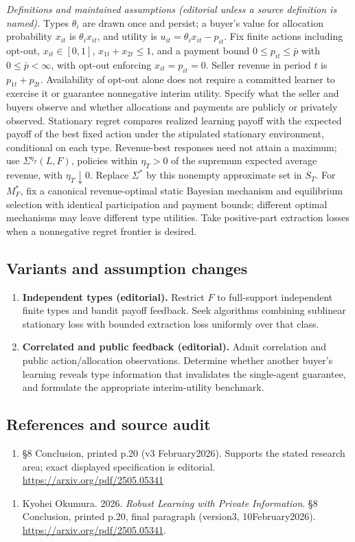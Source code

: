 \documentclass[11pt,a4paper]{article}
\begin{document}
\emph{Definitions and maintained assumptions (editorial unless a source definition is named).} Types \(\theta_i\) are drawn once and persist; a buyer’s value for allocation probability \(x_{it}\) is \(\theta_i x_{it}\), and utility is \(u_{it}=\theta_i x_{it}-p_{it}\). Fix finite actions including opt-out, \(x_{it}\in[0,1]\), \(x_{1t}+x_{2t}\le1\), and a payment bound \(0\le p_{it}\le\bar p\) with \(0\le\bar p<\infty\), with opt-out enforcing \(x_{it}=p_{it}=0\). Seller revenue in period \(t\) is \(p_{1t}+p_{2t}\). Availability of opt-out alone does not require a committed learner to exercise it or guarantee nonnegative interim utility. Specify what the seller and buyers observe and whether allocations and payments are publicly or privately observed. Stationary regret compares realized learning payoff with the expected payoff of the best fixed action under the stipulated stationary environment, conditional on each type. Revenue-best responses need not attain a maximum; use \(\Sigma^{\eta_T}(L,F)\), policies within \(\eta_T>0\) of the supremum expected average revenue, with \(\eta_T\downarrow0\). Replace \(\Sigma^*\) by this nonempty approximate set in \(S_T\). For \(M_F^*\), fix a canonical revenue-optimal static Bayesian mechanism and equilibrium selection with identical participation and payment bounds; different optimal mechanisms may leave different type utilities. Take positive-part extraction losses when a nonnegative regret frontier is desired.
\subsection*{Variants and assumption changes}
\begin{enumerate}
\item \textbf{Independent types (editorial).} Restrict \(F\) to full-support independent finite types and bandit payoff feedback. Seek algorithms combining sublinear stationary loss with bounded extraction loss uniformly over that class.
\item \textbf{Correlated and public feedback (editorial).} Admit correlation and public action/allocation observations. Determine whether another buyer’s learning reveals type information that invalidates the single-agent guarantee, and formulate the appropriate interim-utility benchmark.
\end{enumerate}
\subsection*{References and source audit}
\begin{enumerate}
\item §8 Conclusion, printed p.20 (v3 February2026). Supports the stated research area; exact displayed specification is editorial. \url{https://arxiv.org/pdf/2505.05341}
\end{enumerate}
\begin{enumerate}\raggedright
\item\hypertarget{definitions:source:30007569:1}{} Kyohei Okumura. 2026. \emph{Robust Learning with Private Information}. §8 Conclusion, printed p.20, final paragraph (version3, 10February2026).
\url{https://arxiv.org/pdf/2505.05341}.
\end{enumerate}
\end{document}
